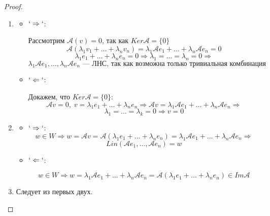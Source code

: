 \begin{proof}
    \begin{enumerate}
        \item \begin{itemize}
            \item $`\Rightarrow`$:

            Рассмотрим $\mathcal{A}(v) = 0$, так как $Ker \mathcal{A} = \{ 0 \}$
            \[
            \mathcal{A}(\lambda_1 v_1 + \ldots + \lambda_n v_n) = \lambda_1 \mathcal{A} e_1 + \ldots + \lambda_n \mathcal{A} e_n = 0
            \]
            \[
            \lambda_1 e_1 + \ldots + \lambda_n e_n = 0 \Rightarrow \lambda_1 = \ldots = \lambda_n = 0 \Rightarrow
            \]
            \[
            \lambda_1 \mathcal{A} e_1, \ldots, \lambda_n \mathcal{A} e_n \text{~--- ЛНС, так как возможна только тривиальная комбинация}
            \]

            \item $`\Leftarrow`$:
            
            Докажем, что $Ker \mathcal{A} = \{ 0 \}$:
            \[
            \mathcal{A}v = 0, \; v = \lambda_1 e_1 + \ldots + \lambda_n e_n \Rightarrow
            \mathcal{A}v = \lambda_1 \mathcal{A} e_1 + \ldots + \lambda_n \mathcal{A} e_n \Rightarrow 
            \]
            \[
            \lambda_1 = \ldots = \lambda_k = 0 \Rightarrow v = 0
            \]
        \end{itemize}
        \item \begin{itemize}
            \item $`\Rightarrow`$:
            \[
            w \in W \Rightarrow w = \mathcal{A}v = \mathcal{A}(\lambda_1 e_1 + \ldots + \lambda_n e_n) =
            \lambda_1 \mathcal{A} e_1 + \ldots + \lambda_n \mathcal{A} e_n \Rightarrow
            \]
            \[
            Lin(\mathcal{A} e_1, \ldots, \mathcal{A} e_n) = w
            \]
            \item $`\Leftarrow`$:
            
            \[
            w \in W \Rightarrow w = \lambda_1 \mathcal{A} e_1 + \ldots + \lambda_n \mathcal{A} e_n = 
            \mathcal{A}(\lambda_1 e_1 + \ldots + \lambda_n e_n) \in Im \mathcal{A}
            \]
        \end{itemize}
        \item Следует из первых двух.
    \end{enumerate}
\end{proof}

